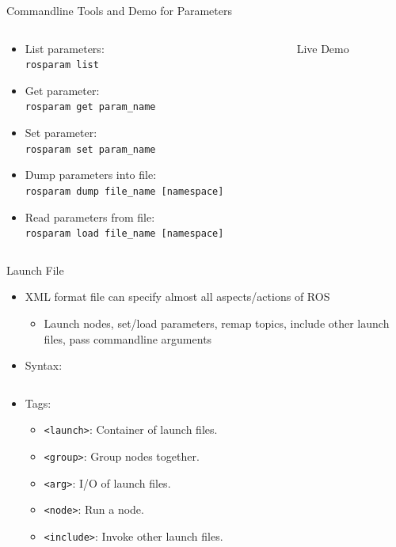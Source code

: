 \documentclass[aspectratio=43]{beamer}
\newcommand{\inline}[1]{\texttt{#1}}
\begin{document}
\begin{frame}{Commandline Tools and Demo for Parameters}
	\begin{columns}
		\begin{column}{0.5\textwidth}
			\begin{itemize}
				\item List parameters:\\\inline{rosparam list}
				\item Get parameter:\\\inline{rosparam get param_name}
				\item Set parameter:\\\inline{rosparam set param_name}
				\item Dump parameters into file:\\\inline{rosparam dump file_name [namespace]}
				\item Read parameters from file:\\\inline{rosparam load file_name [namespace]}
			\end{itemize}
		\end{column}
		\begin{column}{0.5\textwidth}
			\centering
      Live Demo
		\end{column}
	\end{columns}
\end{frame}


\begin{frame}{Launch File}
	\begin{itemize}
		\item XML format file can specify almost all aspects/actions of ROS
		\begin{itemize}
			\item Launch nodes, set/load parameters, remap topics, include other launch files, pass commandline arguments
		\end{itemize}
		\item Syntax: \inputminted{xml}{snippet/launch_syntax.launch}
		\item Tags:
			\begin{itemize}
				\item \inline{<launch>}: Container of launch files.
				\item \inline{<group>}: Group nodes together.
				\item \inline{<arg>}: I/O of launch files.
				\item \inline{<node>}: Run a node.
				\item \inline{<include>}: Invoke other launch files.
			\end{itemize}
	\end{itemize}
\end{frame}
\end{document}
